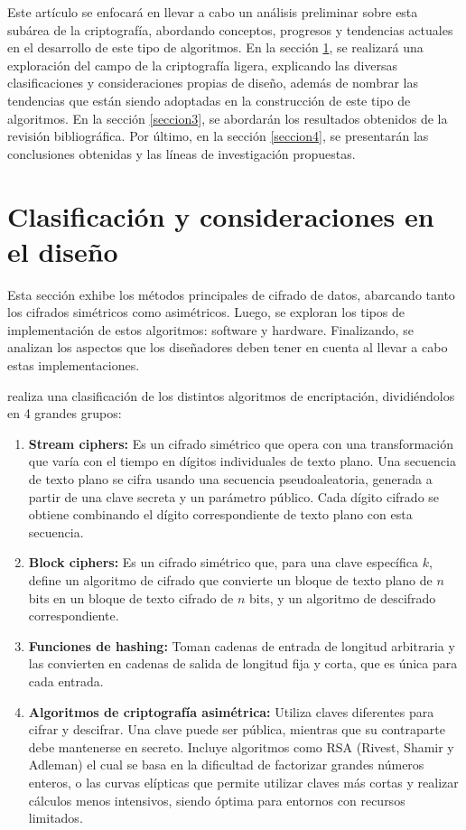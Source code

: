 \documentclass[a4paper,10pt]{article}
\begin{document}
	Este artículo se enfocará en llevar a cabo un análisis preliminar sobre esta subárea de la criptografía, abordando conceptos, progresos y tendencias actuales en el desarrollo de este tipo de algoritmos. En la sección \ref{seccion2}, se realizará una exploración del campo de la criptografía ligera, explicando las diversas clasificaciones y consideraciones propias de diseño, además de nombrar las tendencias que están siendo adoptadas en la construcción de este tipo de algoritmos. En la sección \ref{seccion3}, se abordarán los resultados obtenidos de la revisión bibliográfica. Por último, en la sección \ref{seccion4}, se presentarán las conclusiones obtenidas y las líneas de investigación propuestas.
	
	\section{Clasificación y consideraciones en el diseño}
	\label{seccion2}
	Esta sección exhibe los métodos principales de cifrado de datos, abarcando tanto los cifrados simétricos como asimétricos. Luego, se exploran los tipos de implementación de estos algoritmos: software y hardware. Finalizando, se analizan los aspectos que los diseñadores deben tener en cuenta al llevar a cabo estas implementaciones.
	
	\textcite{wehbe2022criptografia} realiza una clasificación de los distintos algoritmos de encriptación, dividiéndolos en 4 grandes grupos:
	\begin{enumerate}
		\item \textbf{Stream ciphers: }Es un cifrado simétrico que opera con una transformación que varía con el tiempo en dígitos individuales de texto plano. Una secuencia de texto plano se cifra usando una secuencia pseudoaleatoria, generada a partir de una clave secreta y un parámetro público. Cada dígito cifrado se obtiene combinando el dígito correspondiente de texto plano con esta secuencia.
		\item \textbf{Block ciphers:} Es un cifrado simétrico que, para una clave específica $k$, define un algoritmo de cifrado que convierte un bloque de texto plano de $n$ bits en un bloque de texto cifrado de $n$ bits, y un algoritmo de descifrado correspondiente.
		\item \textbf{Funciones de hashing: }Toman cadenas de entrada de longitud arbitraria y las convierten en cadenas de salida de longitud fija y corta, que es única para cada entrada.
		\item \textbf{Algoritmos de criptografía asimétrica:} Utiliza claves diferentes para cifrar y descifrar. Una clave puede ser pública, mientras que su contraparte debe mantenerse en secreto. Incluye algoritmos como RSA (Rivest, Shamir y Adleman) el cual se basa en la dificultad de factorizar grandes números enteros, o las curvas elípticas que permite utilizar claves más cortas y realizar cálculos menos intensivos, siendo óptima para entornos con recursos limitados.
	\end{enumerate}
	
\end{document}
